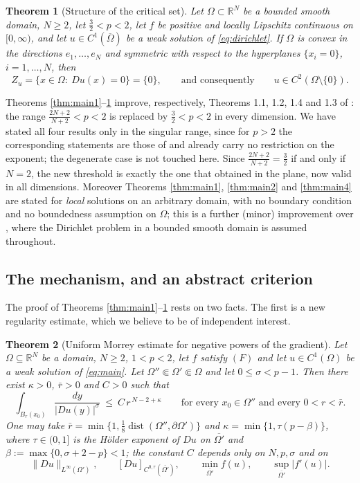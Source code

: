 \documentclass[reqno]{amsart}
\theoremstyle{plain}
\newtheorem{theorem}{Theorem}
\theoremstyle{definition}
\theoremstyle{remark}
\newcommand{\R}{\mathbb{R}}
\newcommand{\dist}{\operatorname{dist}}
\begin{document}
\begin{theorem}[Structure of the critical set]\label{thm:main3}
Let $\Omega\subset\R^N$ be a bounded smooth domain, $N\ge2$, let $\frac32<p<2$, let $f$ be positive
and locally Lipschitz continuous on $[0,\infty)$, and let $u\in C^1(\overline\Omega)$ be a weak
solution of \eqref{eq:dirichlet}. If $\Omega$ is convex in the directions $e_1,\dots,e_N$ and
symmetric with respect to the hyperplanes $\{x_i=0\}$, $i=1,\dots,N$, then
\[
Z_u=\{x\in\Omega:\ Du(x)=0\}=\{0\}, \qquad\text{and consequently}\qquad u\in C^2(\Omega\setminus\{0\}).
\]
\end{theorem}

Theorems \ref{thm:main1}--\ref{thm:main3} improve, respectively, Theorems 1.1, 1.2, 1.4 and 1.3 of
\cite{DS2}: the range $\frac{2N+2}{N+2}<p<2$ is replaced by $\frac32<p<2$ in every dimension. We have stated
all four results only in the singular range, since for $p>2$ the corresponding statements are those
of \cite[Theorems 1.1--1.4]{DS2} and already carry no restriction on the exponent; the degenerate
case is not touched here. Since
$\frac{2N+2}{N+2}=\frac32$ if and only if $N=2$, the new threshold is exactly the one that
\cite{DS2} obtained in the plane, now valid in all dimensions. Moreover Theorems \ref{thm:main1},
\ref{thm:main2} and \ref{thm:main4} are stated for \emph{local} solutions on an arbitrary domain,
with no boundary condition and no boundedness assumption on $\Omega$; this is a further (minor)
improvement over \cite{DS2}, where the Dirichlet problem in a bounded smooth domain is assumed
throughout.

\subsection{The mechanism, and an abstract criterion}
The proof of Theorems \ref{thm:main1}--\ref{thm:main3} rests on two facts. The first is a new
regularity estimate, which we believe to be of independent interest.

\begin{theorem}[Uniform Morrey estimate for negative powers of the gradient]\label{thm:morrey}
Let $\Omega\subseteq\R^N$ be a domain, $N\ge2$, $1<p<2$, let $f$ satisfy $(F)$ and let
$u\in C^1(\Omega)$ be a weak solution of \eqref{eq:main}. Let $\Omega''\Subset\Omega'\Subset\Omega$
and let $0\le\sigma<p-1$. Then there exist $\kappa>0$, $\bar r>0$ and $C>0$ such that
\begin{equation}\label{eq:morrey}
\int_{B_r(x_0)}\frac{dy}{|Du(y)|^{\sigma}}\ \le\ C\,r^{\,N-2+\kappa}
\qquad\text{for every }x_0\in\Omega''\text{ and every }0<r<\bar r .
\end{equation}
One may take $\bar r=\min\{1,\frac18\dist(\Omega'',\partial\Omega')\}$ and
$\kappa=\min\{1,\tau(p-\beta)\}$, where $\tau\in(0,1]$ is the H\"older exponent of $Du$ on
$\overline{\Omega'}$ and $\beta:=\max\{0,\sigma+2-p\}<1$; the constant $C$ depends only on
$N,p,\sigma$ and on
\[
\|Du\|_{L^{\infty}(\Omega')},\qquad [Du]_{C^{0,\tau}(\overline{\Omega'})},\qquad
\min_{\overline{\Omega'}}f(u),\qquad \sup_{\overline{\Omega'}}|f'(u)| .
\]
\end{theorem}
\end{document}
